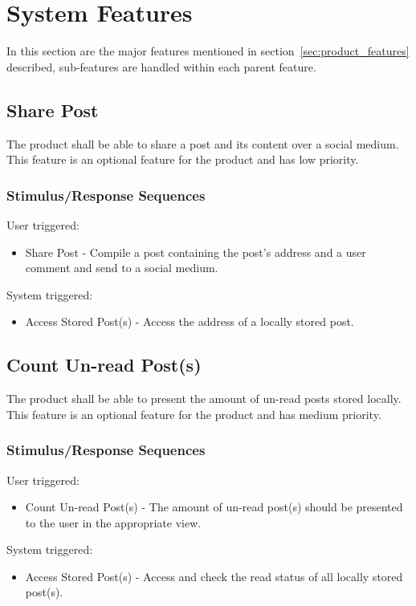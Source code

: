 \section{System Features}
In this section are the major features mentioned in section~\ref{sec:product_features} described, sub-features are handled within each parent feature. 

\subsection{Share Post}
The product shall be able to share a post and its content over a social medium. This feature is an optional feature for the product and has low priority.


\subsubsection{Stimulus/Response Sequences}
User triggered:
\begin{itemize}
  \item Share Post - Compile a post containing the post's address and a user comment and send to a social medium.
\end{itemize}
System triggered:
\begin{itemize}
  \item Access Stored Post(s) - Access the address of a locally stored post.
\end{itemize}


\subsection{Count Un-read Post(s)}
The product shall be able to present the amount of un-read posts stored locally. This feature is an optional feature for the product and has medium priority.


\subsubsection{Stimulus/Response Sequences}
User triggered:
\begin{itemize}
  \item Count Un-read Post(s) - The amount of un-read post(s) should be presented to the user in the appropriate view.
\end{itemize}
System triggered:
\begin{itemize}
  \item Access Stored Post(s) - Access and check the read status of all locally stored post(s).
\end{itemize}


